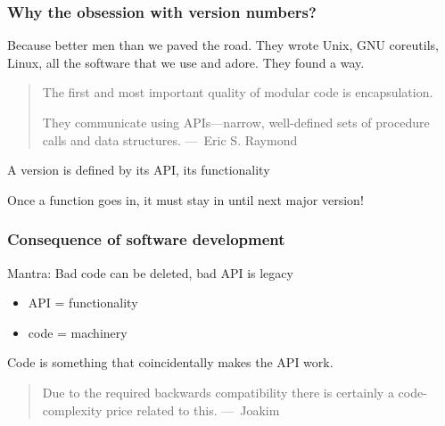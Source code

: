 \documentclass{beamer}
\newcommand{\bigpause}{\bigskip\pause}
\begin{document}
\begin{frame}
  \frametitle{Why the obsession with version numbers?}

  Because better men than we paved the road.  They wrote Unix, GNU coreutils,
  Linux, all the software that we use and adore.  They found a way.

  \bigskip

  \begin{quote}
    The first and most important quality of modular code is encapsulation.

    They communicate using APIs---narrow, well-defined sets of procedure calls
    and data structures.  ---~Eric S. Raymond
  \end{quote}

  A version is defined by its API, its functionality

  \bigskip

  Once a function goes in, it must stay in until next major version!
\end{frame}

\begin{frame}
  \frametitle{Consequence of software development}

  Mantra: Bad code can be deleted, bad API is legacy


  \begin{itemize}
  \item API = functionality
  \item code = machinery
  \end{itemize}

  Code is something that coincidentally makes the API work.

  \bigpause

  \begin{quote}
    Due to the required backwards compatibility there is certainly a
    code-complexity price related to this.  ---~Joakim
  \end{quote}
\end{frame}
\end{document}
